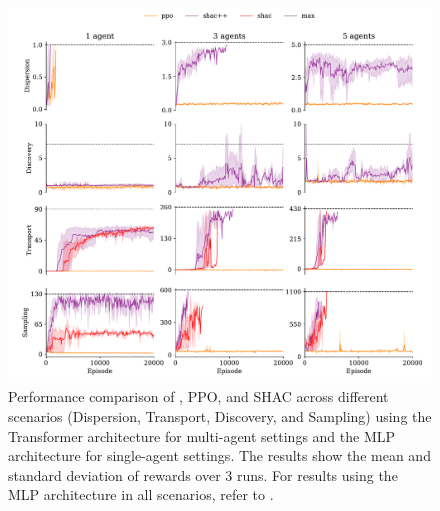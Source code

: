 \begin{figure}
    \includegraphics[width=\textwidth]{figs/main-transformer.pdf}
    \caption{Performance comparison of \fname{}, PPO, and SHAC across different scenarios (Dispersion, Transport, Discovery, and Sampling) using the Transformer architecture for multi-agent settings and the MLP architecture for single-agent settings. The results show the mean and standard deviation of rewards over 3 runs. For results using the MLP architecture in all scenarios, refer to .}%
    \label{fig:experiments}
\end{figure}

